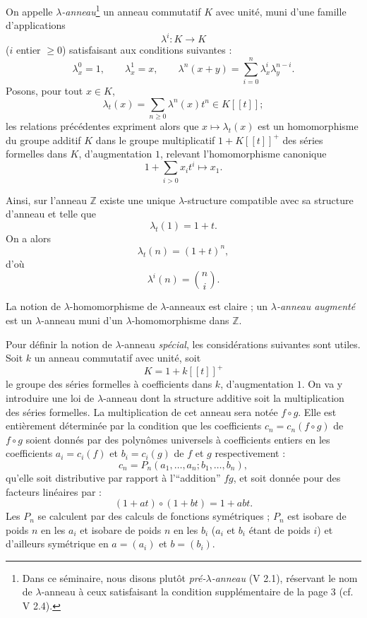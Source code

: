 \documentclass[11pt]{article}
\providecommand{\Z}{\mathbb Z}
\begin{document}
On appelle \emph{$\lambda$-anneau}\footnote{Dans ce séminaire, nous disons plutôt \emph{pré-$\lambda$-anneau} (V 2.1), réservant le nom de $\lambda$-anneau à ceux satisfaisant la condition supplémentaire de la page 3 (cf. V 2.4).} un anneau commutatif $K$ avec unité, muni d'une famille d'applications
\begin{equation}\tag{1.1}
\lambda^i:K\longrightarrow K
\end{equation}
($i$ entier $\geq 0$) satisfaisant aux conditions suivantes :
\begin{equation}\tag{1.2}
\lambda_x^0=1,\qquad \lambda_x^1=x,\qquad
\lambda^n(x+y)=\sum_{i=0}^n\lambda_x^i\lambda_y^{n-i}.
\end{equation}
Posons, pour tout $x\in K$,
\begin{equation}\tag{1.3}
\lambda_t(x)=\sum_{n\geq 0}\lambda^n(x)t^n\in K[[t]] ;
\end{equation}
les relations précédentes expriment alors que $x\longmapsto\lambda_t(x)$ est un homomorphisme du groupe additif $K$ dans le groupe multiplicatif $1+K[[t]]^+$ des séries formelles dans $K$, d'augmentation $1$, relevant l'homomorphisme canonique
\[
1+\sum_{i>0}x_it^i\longmapsto x_1.
\]

Ainsi, sur l'anneau $\Z$ existe une unique $\lambda$-structure compatible avec sa structure d'anneau et telle que
\begin{equation}\tag{1.4}
\lambda_t(1)=1+t.
\end{equation}
On a alors
\begin{equation}\tag{1.5}
\lambda_t(n)=(1+t)^n,
\end{equation}
d'où
\[
\lambda^i(n)=\binom{n}{i}.
\]

La notion de $\lambda$-homomorphisme de $\lambda$-anneaux est claire ; un \emph{$\lambda$-anneau augmenté} est un $\lambda$-anneau muni d'un $\lambda$-homomorphisme dans $\Z$.

Pour définir la notion de $\lambda$-anneau \emph{spécial}, les considérations suivantes sont utiles. Soit $k$ un anneau commutatif avec unité, soit
\[
K=1+k[[t]]^+
\]
le groupe des séries formelles à coefficients dans $k$, d'augmentation $1$. On va y introduire une loi de $\lambda$-anneau dont la structure additive soit la multiplication des séries formelles. La multiplication de cet anneau sera notée $f\circ g$. Elle est entièrement déterminée par la condition que les coefficients $c_n=c_n(f\circ g)$ de $f\circ g$ soient donnés par des polynômes universels à coefficients entiers en les coefficients $a_i=c_i(f)$ et $b_i=c_i(g)$ de $f$ et $g$ respectivement :
\begin{equation}\tag{1.6}
c_n=P_n(a_1,\ldots,a_n;b_1,\ldots,b_n),
\end{equation}
qu'elle soit distributive par rapport à l'``addition'' $fg$, et soit donnée pour des facteurs linéaires par :
\begin{equation}\tag{1.7}
(1+at)\circ(1+bt)=1+abt.
\end{equation}
Les $P_n$ se calculent par des calculs de fonctions symétriques ; $P_n$ est isobare de poids $n$ en les $a_i$ et isobare de poids $n$ en les $b_i$ ($a_i$ et $b_i$ étant de poids $i$) et d'ailleurs symétrique en $a=(a_i)$ et $b=(b_i)$.
\end{document}
